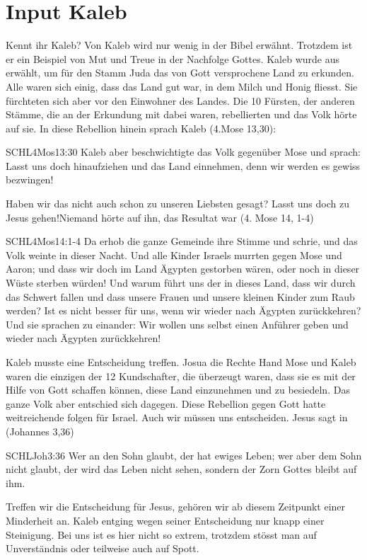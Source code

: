 \section{Input Kaleb}
Kennt ihr Kaleb?
Von Kaleb wird nur wenig in der Bibel erwähnt. Trotzdem ist er ein Beispiel von Mut und Treue in der Nachfolge Gottes. Kaleb wurde aus erwählt, um für den Stamm Juda das von Gott versprochene Land zu erkunden. Alle waren sich einig, dass das Land gut war, in dem Milch und Honig fliesst. Sie fürchteten sich aber vor den Einwohner des Landes. Die 10 Fürsten, der anderen Stämme, die an der Erkundung mit dabei waren, rebellierten und das Volk hörte auf sie. In diese Rebellion hinein sprach Kaleb (4.Mose 13,30):
\begin{bibelbox}{SCHL}{4Mos}{13:30}
Kaleb aber beschwichtigte das Volk gegenüber Mose und sprach: \glqq{}Lasst uns doch hinaufziehen und das Land einnehmen, denn wir werden es gewiss bezwingen!\grqq
\end{bibelbox}
Haben wir das nicht auch schon zu unseren Liebsten gesagt? \glqq{}Lasst uns doch zu Jesus gehen!\grqq Niemand hörte auf ihn, das Resultat war (4. Mose 14, 1-4)
\begin{bibelbox}{SCHL}{4Mos}{14:1-4}
Da erhob die ganze Gemeinde ihre Stimme und schrie, und das Volk weinte in dieser Nacht. Und alle Kinder Israels murrten gegen Mose und Aaron; und dass wir doch im Land Ägypten gestorben wären, oder noch in dieser Wüste sterben würden! Und warum führt uns der \herr{} in dieses Land, dass wir durch das Schwert fallen und dass unsere Frauen und unsere kleinen Kinder zum Raub werden? Ist es nicht besser für uns, wenn wir wieder nach Ägypten zurückkehren? Und sie sprachen zu einander: \glqq{}Wir wollen uns selbst einen Anführer geben und wieder nach Ägypten zurückkehren!\grqq
\end{bibelbox}
Kaleb musste eine Entscheidung treffen. Josua die Rechte Hand Mose und Kaleb waren die einzigen der 12 Kundschafter, die überzeugt waren, dass sie es mit der Hilfe von Gott schaffen können, diese Land einzunehmen und zu besiedeln. Das ganze Volk aber entschied sich dagegen. Diese Rebellion gegen Gott hatte weitreichende folgen für Israel.
Auch wir müssen uns entscheiden. Jesus sagt in (Johannes 3,36)
\begin{bibelbox}{SCHL}{Joh}{3:36}
Wer an den Sohn glaubt, der hat ewiges Leben; wer aber dem Sohn nicht glaubt, der wird das Leben nicht sehen, sondern der Zorn Gottes bleibt auf ihm.
\end{bibelbox}
Treffen wir die Entscheidung für Jesus, gehören wir ab diesem Zeitpunkt einer Minderheit an. Kaleb entging wegen seiner Entscheidung nur knapp einer Steinigung. Bei uns ist es hier nicht so extrem, trotzdem stösst man auf Unverständnis oder teilweise auch auf Spott.
